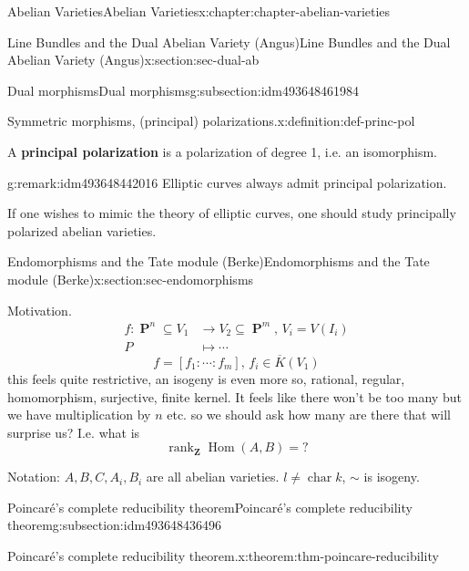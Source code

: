 \documentclass[oneside,10pt,]{book}
\newcommand{\terminology}[1]{\textbf{#1}}
\numberwithin{equation}{section}
\newcommand{\lb}{[}
\newcommand{\rb}{]}
\newcommand{\ZZ}{\mathbf{Z}}
\DeclareMathOperator{\Hom}{Hom}
\DeclareMathOperator{\rank}{rank}
\DeclareMathOperator{\characteristic}{char}
\DeclareMathOperator{\PP}{\mathbf{P}}
\newcommand{\amp}{&}
\begin{document}
\begin{chapterptx}{Abelian Varieties}{}{Abelian Varieties}{}{}{x:chapter:chapter-abelian-varieties}
\begin{sectionptx}{Line Bundles and the Dual Abelian Variety (Angus)}{}{Line Bundles and the Dual Abelian Variety (Angus)}{}{}{x:section:sec-dual-ab}
\begin{subsectionptx}{Dual morphisms}{}{Dual morphisms}{}{}{g:subsection:idm493648461984}
\begin{definition}{Symmetric morphisms, (principal) polarizations.}{x:definition:def-princ-pol}
\par
A \terminology{principal polarization} is a polarization of degree 1, i.e. an isomorphism.%
\end{definition}
\begin{remark}{}{g:remark:idm493648442016}%
Elliptic curves always admit principal polarization.%
\par
If one wishes to mimic the theory of elliptic curves, one should study principally polarized abelian varieties.%
\end{remark}
\end{subsectionptx}
\end{sectionptx}
%
%
\typeout{************************************************}
\typeout{************************************************}
%
\begin{sectionptx}{Endomorphisms and the Tate module (Berke)}{}{Endomorphisms and the Tate module (Berke)}{}{}{x:section:sec-endomorphisms}
\begin{introduction}{Motivation.}%
%
\begin{align*}
f \colon \PP^n\subseteq V_1 \amp\to V_2 \subseteq \PP^m,\,V_i = V(I_i)\\
P\amp \mapsto \cdots
\end{align*}
%
\begin{equation*}
f = \lb f_1 : \cdots : f_m\rb ,\,f_i\in \overline K (V_1)
\end{equation*}
this feels quite restrictive, an isogeny is even more so, rational, regular, homomorphism, surjective, finite kernel. It feels like there won't be too many but we have multiplication by \(n\) etc. so we should ask how many are there that will surprise us? I.e. what is%
\begin{equation*}
\rank_\ZZ \Hom(A,B) = ?
\end{equation*}
%
\par
Notation: \(A,B,C , A_i,  B_i\) are all abelian varieties. \(l \ne \characteristic k\), \(\sim\) is isogeny.%
\end{introduction}%
%
%
\typeout{************************************************}
\typeout{************************************************}
%
\begin{subsectionptx}{Poincaré's complete reducibility theorem}{}{Poincaré's complete reducibility theorem}{}{}{g:subsection:idm493648436496}
\begin{theorem}{Poincaré's complete reducibility theorem.}{}{x:theorem:thm-poincare-reducibility}%

\end{theorem}
\end{subsectionptx}
\end{sectionptx}
\end{chapterptx}
\end{document}
